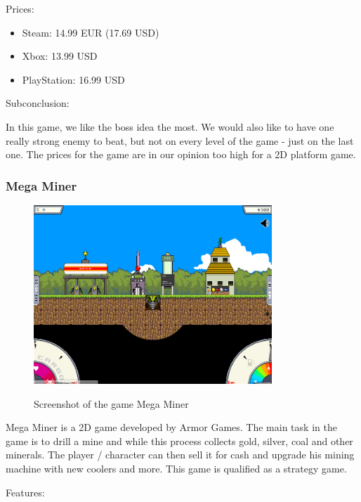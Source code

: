 \documentclass[12p]{article}
\begin{document}
Prices:

\begin{itemize}
  \item Steam: 14.99 EUR (17.69 USD)
  \item Xbox: 13.99 USD
  \item PlayStation: 16.99 USD
\end{itemize}

Subconclusion:

In this game, we like the boss idea the most. We would also like to have one really strong enemy to beat, but not on every level of the game - just on the last one. The prices for the game are in our opinion too high for a 2D platform game.



\newpage
\subsubsection[Mega Miner]{Mega Miner \cite{MegaMiner}}

\begin{figure}[ht]
  \center
  \includegraphics[width=0.8\textwidth]{StateOfTheArtScreenshots/mega_miner}
  \label{sec:StateOfTheArt_Screenshots_MegaMiner}
  \caption{Screenshot of the game Mega Miner}
\end{figure}

Mega Miner is a 2D game developed by Armor Games. The main task in the game is to drill a mine and while this process collects gold, silver, coal and other minerals. The player / character can then sell it for cash and upgrade his mining machine with new coolers and more. This game is qualified as a strategy game.

Features:
\end{document}
